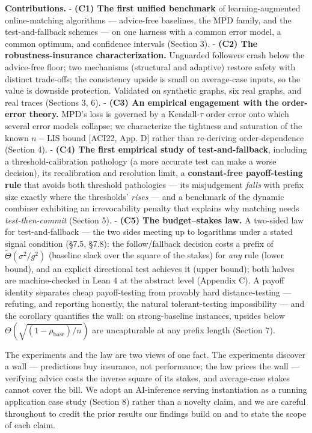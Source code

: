 \textbf{Contributions.} - \textbf{(C1) The first unified benchmark} of
learning-augmented online-matching algorithms --- advice-free baselines,
the MPD family, and the test-and-fallback schemes --- on one harness
with a common error model, a common optimum, and confidence intervals
(Section 3). - \textbf{(C2) The robustness-insurance characterization.}
Unguarded followers crash below the advice-free floor; two mechanisms
(structural and adaptive) restore safety with distinct trade-offs; the
consistency upside is small on average-case inputs, so the value is
downside protection. Validated on synthetic graphs, six real graphs, and
real traces (Sections 3, 6). - \textbf{(C3) An empirical engagement with
the order-error theory.} MPD's loss is governed by a Kendall-\(\tau\)
order error onto which several error models collapse; we characterize
the tightness and saturation of the known \(n{-}\mathrm{LIS}\) bound
{[}ACI22, App. D{]} rather than re-deriving order-dependence (Section
4). - \textbf{(C4) The first empirical study of test-and-fallback},
including a threshold-calibration pathology (a more accurate test can
make a worse decision), its recalibration and resolution limit, a
\textbf{constant-free payoff-testing rule} that avoids both threshold
pathologies --- its misjudgement \emph{falls} with prefix size exactly
where the thresholds' \emph{rises} --- and a benchmark of the dynamic
combiner exhibiting an irrevocability penalty that explains why matching
needs \emph{test-then-commit} (Section 5). - \textbf{(C5) The
budget--stakes law.} A two-sided law for test-and-fallback --- the two
sides meeting up to logarithms under a stated signal condition (§7.5,
§7.8): the follow/fallback decision costs a prefix of
\(\tilde\Theta(\sigma^2/g^2)\) (baseline slack over the square of the
stakes) for \emph{any} rule (lower bound), and an explicit directional
test achieves it (upper bound); both halves are machine-checked in Lean
4 at the abstract level (Appendix C). A payoff identity separates cheap
payoff-testing from provably hard distance-testing --- refuting, and
reporting honestly, the natural tolerant-testing impossibility --- and
the corollary quantifies the wall: on strong-baseline instances, upsides
below \(\Theta(\sqrt{(1-\rho_{\mathrm{base}})/n})\) are uncapturable at
any prefix length (Section 7).

The experiments and the law are two views of one fact. The experiments
discover a wall --- predictions buy insurance, not performance; the law
prices the wall --- verifying advice costs the inverse square of its
stakes, and average-case stakes cannot cover the bill. We adopt an
AI-inference serving instantiation as a running application case study
(Section 8) rather than a novelty claim, and we are careful throughout
to credit the prior results our findings build on and to state the scope
of each claim.
